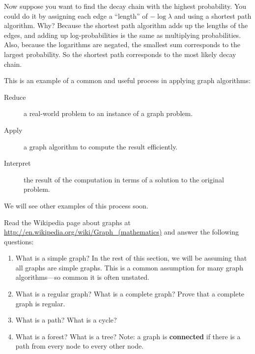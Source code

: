\documentclass[10pt]{book}
\begin{document}
Now suppose you want to find the decay chain with the highest
probability.  You could do it by assigning each edge a ``length'' of
$-\log \lambda$ and using a shortest path algorithm.  Why?  Because the
shortest path algorithm adds up the lengths of the edges, and adding
up log-probabilities is the same as multiplying probabilities.  Also,
because the logarithms are negated, the smallest sum corresponds to
the largest probability.  So the shortest path corresponds to the most
likely decay chain.

This is an example of a common and useful process in applying
graph algorithms:

\begin{description}

\item[Reduce] a real-world problem to an instance of a graph
problem.
 
\item[Apply] a graph algorithm to compute the result efficiently.

\item[Interpret] the result of the computation in terms of a
solution to the original problem.

\end{description}

We will see other examples of this process soon.

\begin{ex}

Read the Wikipedia page about graphs at
\url{http://en.wikipedia.org/wiki/Graph_(mathematics)}
and answer the following questions:

\begin{enumerate}

\item What is a simple graph?  In the rest of this section,
we will be assuming that all graphs are simple graphs.  This
is a common assumption for many graph algorithms---so
common it is often unstated.

\item What is a regular graph?  What is a complete graph?  Prove
that a complete graph is regular.

\item What is a path?  What is a cycle?

\item What is a forest?  What is a tree?  Note: a graph
is {\bf connected} if there is a path from every node to
every other node.

\end{enumerate}

\end{ex}
\end{document}

